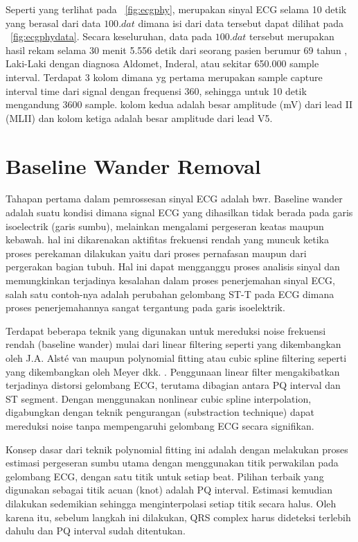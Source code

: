Seperti yang terlihat pada \pic~\ref{fig:ecgphy}, merupakan sinyal ECG selama
10 detik yang berasal dari data $100.dat$ dimana isi dari data tersebut dapat
dilihat pada \pic~\ref{fig:ecgphydata}. Secara keseluruhan, data pada $100.dat$
tersebut merupakan hasil rekam selama 30 menit 5.556 detik dari seorang pasien
berumur 69 tahun , Laki-Laki dengan diagnosa Aldomet, Inderal, atau sekitar
650.000 sample interval. Terdapat 3 kolom dimana yg pertama merupakan sample
capture interval time dari signal dengan frequensi 360, sehingga untuk 10 detik
mengandung 3600 sample. kolom kedua adalah besar amplitude (mV) dari lead II
(MLII) dan kolom ketiga adalah besar amplitude dari lead V5.

\section{Baseline Wander Removal}
Tahapan pertama dalam pemrossesan sinyal ECG adalah \gls{bwr}. Baseline wander
adalah suatu kondisi dimana signal ECG yang dihasilkan tidak berada pada garis
isoelectrik (garis sumbu), melainkan mengalami pergeseran keatas maupun
kebawah. hal ini dikarenakan aktifitas frekuensi rendah yang muncuk ketika 
proses perekaman dilakukan yaitu dari proses pernafasan maupun dari pergerakan
bagian tubuh. Hal ini dapat mengganggu proses analisis sinyal dan memungkinkan
terjadinya kesalahan dalam proses penerjemahan sinyal ECG,  salah satu
contoh-nya adalah perubahan gelombang ST-T pada ECG dimana  proses
penerjemahannya sangat tergantung pada garis isoelektrik.

Terdapat beberapa teknik yang digunakan untuk mereduksi noise frekuensi rendah
(baseline wander) mulai dari linear filtering seperti yang dikembangkan oleh
J.A. {Alst\'{e}} van \cite{Alst:1986} maupun polynomial fitting atau cubic
spline filtering seperti yang dikembangkan oleh Meyer dkk. \cite{Meyer:1977}.
Penggunaan linear filter mengakibatkan terjadinya distorsi gelombang ECG,
terutama dibagian antara PQ interval dan ST segment. Dengan menggunakan
nonlinear cubic spline interpolation, digabungkan dengan teknik pengurangan
(substraction technique) dapat mereduksi noise tanpa mempengaruhi gelombang ECG
secara signifikan.

Konsep dasar dari teknik polynomial fitting ini adalah dengan melakukan proses
estimasi pergeseran sumbu utama dengan menggunakan titik perwakilan pada
gelombang ECG, dengan satu titik untuk setiap beat. Pilihan terbaik yang
digunakan sebagai titik acuan (knot) adalah PQ interval. Estimasi kemudian
dilakukan sedemikian sehingga menginterpolasi setiap titik secara halus. Oleh
karena itu, sebelum langkah ini dilakukan, QRS complex harus dideteksi  terlebih
dahulu dan PQ interval sudah ditentukan.

